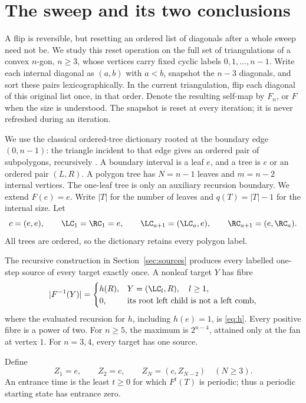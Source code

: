 \section{The sweep and its two conclusions}\label{sec:setup}

A flip is reversible, but resetting an ordered list of diagonals after a
whole sweep need not be. We study this reset operation on the full set of
triangulations of a convex \(n\)-gon, \(n\ge3\), whose vertices carry fixed
cyclic labels \(0,1,\ldots,n-1\). Write each internal diagonal as \((a,b)\)
with \(a<b\), snapshot the \(n-3\) diagonals, and sort these pairs
lexicographically. In the current triangulation, flip each diagonal of
this original list once, in that order. Denote the resulting self-map by
\(F_n\), or \(F\) when the size is understood. The snapshot is reset at
every iteration; it is never refreshed during an iteration.

We use the classical ordered-tree dictionary rooted at the boundary edge
\((0,n-1)\): the triangle incident to that edge gives an ordered pair of
subpolygons, recursively \citep{pallo2006}. A boundary interval is a leaf
\(e\), and a tree is \(e\) or an ordered pair \((L,R)\). A polygon tree has
\(N=n-1\) leaves and \(m=n-2\) internal vertices. The one-leaf tree is only
an auxiliary recursion boundary. We extend \(F(e)=e\). Write \(|T|\) for
the number of leaves and \(q(T)=|T|-1\) for the internal size. Let
\[
 c=(e,e),\qquad \LC_1=\RC_1=e,\qquad
 \LC_{a+1}=(\LC_a,e),\qquad \RC_{a+1}=(e,\RC_a).
\]
All trees are ordered, so the dictionary retains every polygon label.

\begin{theorem}\label{thm:inverse}
The recursive construction in Section~\ref{sec:sources} produces every
labelled one-step source of every target exactly once. A nonleaf target
\(Y\) has fibre
\[
 |F^{-1}(Y)|=
 \begin{cases}
 h(R),&Y=(\LC_l,R),\quad l\ge1,\\
 0,&\text{its root left child is not a left comb},
 \end{cases}
\]
where the evaluated recursion for \(h\), including \(h(e)=1\), is
\eqref{eq:h}. Every positive fibre is a power of two. For \(n\ge5\), the
maximum is \(2^{n-4}\), attained only at the fan at vertex \(1\).
For \(n=3,4\), every target has one source.
\end{theorem}

Define
\[
 Z_1=e,\qquad Z_2=c,\qquad Z_N=(c,Z_{N-2})\quad(N\ge3).
\]
An entrance time is the least \(t\ge0\) for which \(F^t(T)\) is periodic;
thus a periodic starting state has entrance zero.

